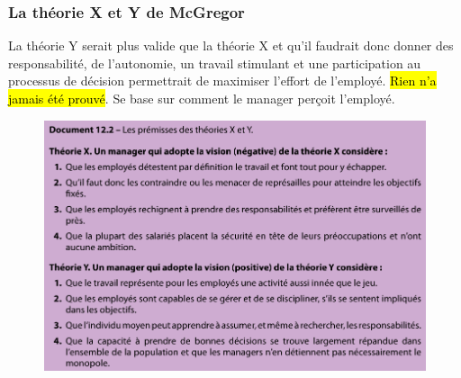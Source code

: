 \documentclass[letterpaper, 12pt]{article}
\begin{document}
		\subsubsection{La théorie X et Y de McGregor}
			La théorie Y serait plus valide que la théorie X et qu'il faudrait donc donner des
				responsabilité, de l'autonomie, un travail stimulant et une participation au processus
				de décision permettrait de maximiser l'effort de l'employé. \hl{Rien n'a jamais \'et\'e
				prouv\'e}. Se base sur comment le manager perçoit l'employé.
			\begin{figure}[H]
				\centering
				\includegraphics[scale=0.65]{Images/x_y}
			\end{figure}\noindent
\end{document}

